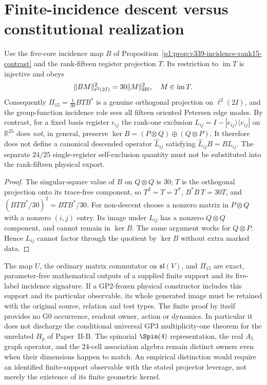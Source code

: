 \documentclass[11pt,a4paper]{article}
\begin{document}
\section{Finite-incidence descent versus constitutional realization}
\label{p2f:sec:v339-petersen-descent-scope}
\begin{proposition}
\label{p2f:prop:v339-projector-descent-certificate}
Use the five-core incidence map $B$ of
Proposition~\ref{p1:prop:v339-incidence-rank15-contrast} and
the rank-fifteen register projection $T$. Its restriction to
$\operatorname{im}T$ is injective and obeys
\[
 \|BM\|_{\ell^2(2I)}^2=30\|M\|_{\rm HS}^2,
 \quad M\in\operatorname{im}T.
\]
Consequently $\Pi_{15}=\tfrac1{30}BTB^*$ is a genuine
orthogonal projection on $\ell^2(2I)$, and the group-function
incidence role sees all fifteen oriented Petersen edge modes.
By contrast, for a fixed basis register $e_{ij}$ the rank-one
exclusion $L_{ij}=I-|e_{ij}\rangle\langle e_{ij}|$ on
$\mathbb R^{25}$ does \emph{not}, in general, preserve
$\ker B=(P\otimes Q)\oplus(Q\otimes P)$.
It therefore does not define a canonical descended operator
$\widehat L_{ij}$ satisfying $\widehat L_{ij}B=BL_{ij}$.
The separate $24/25$ single-register self-exclusion quantity
must not be substituted into the rank-fifteen physical export.
\end{proposition}
\begin{proof}
The singular-square value of $B$ on $Q\otimes Q$ is $30$;
$T$ is the orthogonal projection onto its trace-free component,
so $T^2=T=T^*$, $B^*B\,T=30T$, and
$(BTB^*/30)^2=BTB^*/30$. For non-descent choose a nonzero
matrix in $P\otimes Q$ with a nonzero $(i,j)$ entry.
Its image under $L_{ij}$ has a nonzero $Q\otimes Q$ component,
and cannot remain in $\ker B$. The same argument works for
$Q\otimes P$. Hence $L_{ij}$ cannot factor through the
quotient by $\ker B$ without extra marked data.
\end{proof}

\begin{remark}
\label{p2f:rem:v339-petersen-gp2-gp3-firewall}
The map $U$, the ordinary matrix commutator on
$\mathfrak{sl}(V)$, and $\Pi_{15}$ are exact, parameter-free
mathematical outputs of a supplied finite support and its
five-label incidence signature. If a GP2-frozen physical
constructor includes this support and its particular observable,
its whole generated image must be retained with the original
source, relation and test types. The finite proof by itself
provides no G0 occurrence, readout owner, action or dynamics.
In particular it does not discharge the conditional universal
GP3 multiplicity-one theorem for the unrelated $H_p$ of
Paper~II-B. The spinorial $\Spin(4)$ representation, the real
$A_5$ graph operator, and the 24-cell association algebra
remain distinct owners even when their dimensions happen to
match. An empirical distinction would require an identified
finite-support observable with the stated projector leverage,
not merely the existence of its finite geometric kernel.
\end{remark}
\end{document}
